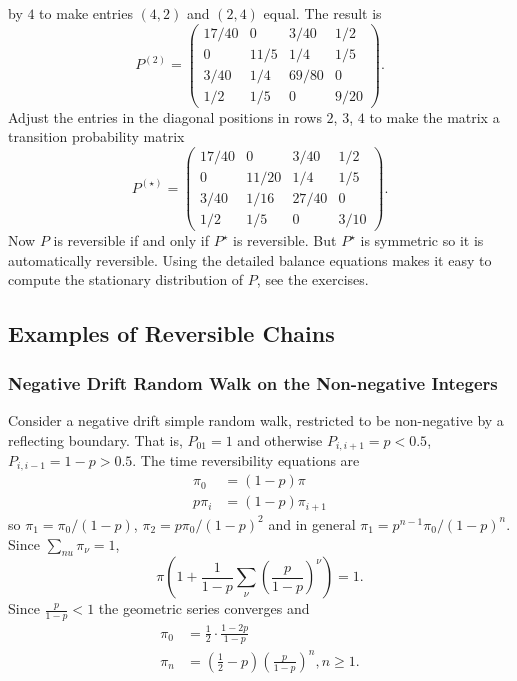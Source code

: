 \documentclass[12pt]{article}
\begin{document}
\begin{example}
    by \( 4 \) to make entries \( (4,2) \) and \( (2,4) \) equal.  The
    result is
    \[
        P^{(2)} =
        \begin{pmatrix}
            17/40       & 0     & 3/40  & 1/2 \\
            0   & 11/5  & 1/4   & 1/5 \\
            3/40        & 1/4   & 69/80 & 0 \\
            1/2 & 1/5   & 0     & 9/20
        \end{pmatrix}
        .
    \] Adjust the entries in the diagonal positions in rows \( 2 \), \(
    3 \), \( 4 \) to make the matrix a transition probability matrix
    \[
        P^{(\star)} =
        \begin{pmatrix}
            17/40       & 0     & 3/40  & 1/2 \\
            0   & 11/20 & 1/4   & 1/5 \\
            3/40        & 1/16  & 27/40 & 0 \\
            1/2 & 1/5   & 0     & 3/10
        \end{pmatrix}
        .
    \] Now \( P \) is reversible if and only if \( P^{\star} \) is
    reversible.  But \( P^{\star} \) is symmetric so it is automatically
    reversible.  Using the detailed balance equations makes it easy to
    compute the stationary distribution of \( P \), see the exercises.

\end{example}
\subsection*{Examples of Reversible Chains}

\subsubsection*{Negative Drift Random Walk on the Non-negative Integers}

Consider a negative drift simple random walk, restricted to be
non-negative by a reflecting boundary. That is, \( P_{01} = 1 \) and
otherwise \( P_{i,i+1} = p < 0.5 \), \( P_{i,i-1} = 1 - p > 0.5 \). The
time reversibility equations are
\begin{align*}
    \pi_0       &= (1-p) \pi \\
    p \pi_{i}   &= (1-p) \pi_{i+1}
\end{align*}
so \( \pi_1 = \pi_0/(1-p) \), \( \pi_2 = p\pi_0/(1-p)^{2} \) and in
general \( \pi_1 = p^{n-1} \pi_0/(1-p)^n \).  Since \( \sum_{nu} \pi_{\nu}
= 1 \),
\[
    \pi \left( 1 + \frac{1}{1-p} \sum_{\nu} \left( \frac{p}{1-p} \right)^{\nu}
    \right) = 1.
\] Since \( \frac{p}{1-p} < 1 \) the geometric series converges and
\begin{align*}
    \pi_0       &= \frac{1}{2}\cdot \frac{1-2p}{1-p} \\
    \pi_n       &= \left( \frac{1}{2} - p \right) \left( \frac{p}{1-p}
    \right)^n, n \ge 1.
\end{align*}
\end{document}
